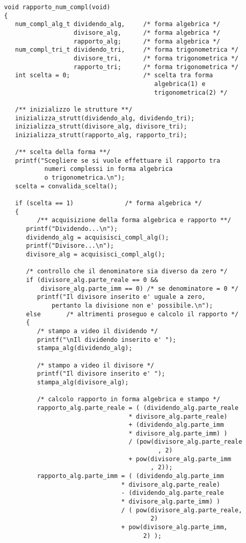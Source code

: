 \documentclass[a4paper,10pt]{article}
\begin{document}
\begin{verbatim}
void rapporto_num_compl(void)
{
   num_compl_alg_t dividendo_alg,     /* forma algebrica */
                   divisore_alg,      /* forma algebrica */
                   rapporto_alg;      /* forma algebrica */
   num_compl_tri_t dividendo_tri,     /* forma trigonometrica */
                   divisore_tri,      /* forma trigonometrica */
                   rapporto_tri;      /* forma trigonometrica */
   int scelta = 0;                    /* scelta tra forma 
                                         algebrica(1) e 
                                         trigonometrica(2) */

   /** inizializzo le strutture **/
   inizializza_strutt(dividendo_alg, dividendo_tri);
   inizializza_strutt(divisore_alg, divisore_tri);
   inizializza_strutt(rapporto_alg, rapporto_tri);

   /** scelta della forma **/
   printf("Scegliere se si vuole effettuare il rapporto tra
           numeri complessi in forma algebrica
           o trigonometrica.\n");
   scelta = convalida_scelta();

   if (scelta == 1)              /* forma algebrica */
   {
         /** acquisizione della forma algebrica e rapporto **/
      printf("Dividendo...\n");
      dividendo_alg = acquisisci_compl_alg();
      printf("Divisore...\n");
      divisore_alg = acquisisci_compl_alg();

      /* controllo che il denominatore sia diverso da zero */
      if (divisore_alg.parte_reale == 0 &&
          divisore_alg.parte_imm == 0) /* se denominatore = 0 */
         printf("Il divisore inserito e' uguale a zero,
	         pertanto la divisione non e' possibile.\n");
      else       /* altrimenti proseguo e calcolo il rapporto */
      {
         /* stampo a video il dividendo */
         printf("\nIl dividendo inserito e' ");
         stampa_alg(dividendo_alg);
	
         /* stampo a video il divisore */
         printf("Il divisore inserito e' ");
         stampa_alg(divisore_alg);

         /* calcolo rapporto in forma algebrica e stampo */
         rapporto_alg.parte_reale = ( (dividendo_alg.parte_reale 
                                  * divisore_alg.parte_reale)
                                  + (dividendo_alg.parte_imm
                                  * divisore_alg.parte_imm) )
                                  / (pow(divisore_alg.parte_reale 
                                          , 2)
                                  + pow(divisore_alg.parte_imm
                                        , 2));
         rapporto_alg.parte_imm = ( (dividendo_alg.parte_imm 
                                * divisore_alg.parte_reale)
                                - (dividendo_alg.parte_reale
                                * divisore_alg.parte_imm) )
                                / ( pow(divisore_alg.parte_reale,
                                        2)
                                + pow(divisore_alg.parte_imm,
                                      2) );
	

\end{verbatim}
\end{document}
